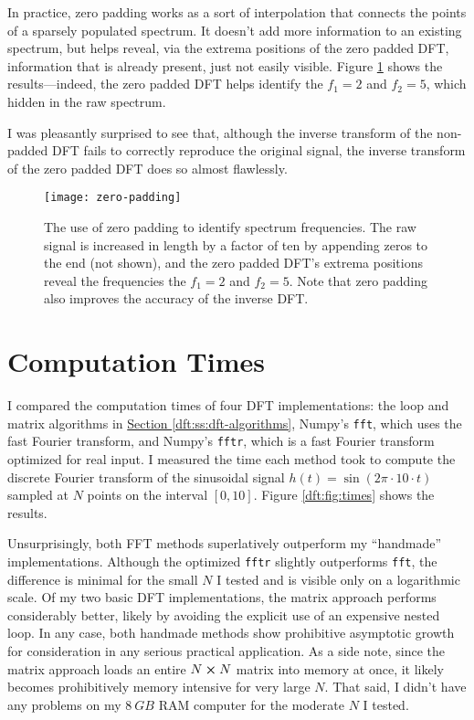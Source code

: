 \documentclass[11pt, a4paper]{article}
\begin{document}
In practice, zero padding works as a sort of interpolation that connects the points of a sparsely populated spectrum. It doesn't add more information to an existing spectrum, but helps reveal, via the extrema positions of the zero padded DFT, information that is already present, just not easily visible. Figure \ref{dft:fig:zero-padding} shows the results---indeed, the zero padded DFT helps identify the $ f_{1} = 2 $ and $ f_{2} = 5 $, which hidden in the raw spectrum.

I was pleasantly surprised to see that, although the inverse transform of the non-padded DFT fails to correctly reproduce the original signal, the inverse transform of the zero padded DFT does so almost flawlessly.  

\begin{figure}[htb!]
\centering
\texttt{[image: zero-padding]}
\vspace{-8mm}
\caption{The use of zero padding to identify spectrum frequencies. The raw signal is increased in length by a factor of ten by appending zeros to the end (not shown), and the zero padded DFT's extrema positions reveal the frequencies the $ f_{1} = 2 $ and $ f_{2} = 5 $. Note that zero padding also improves the accuracy of the inverse DFT.}
\label{dft:fig:zero-padding}
\end{figure}



\section{Computation Times} \label{dft:s:times}
I compared the computation times of four DFT implementations: the loop and matrix algorithms in  \hyperref[dft:ss:dft-algorithms]{Section \ref{dft:ss:dft-algorithms}}, Numpy's \texttt{fft}, which uses the fast Fourier transform, and Numpy's \texttt{fftr}, which is a fast Fourier transform optimized for real input. I measured the time each method took to compute the discrete Fourier transform of the sinusoidal signal $ h(t) = \sin(2\pi \cdot 10 \cdot t) $ sampled at $ N $ points on the interval $ [0, 10] $. Figure \ref{dft:fig:times} shows the results.

Unsurprisingly, both FFT methods superlatively outperform my ``handmade'' implementations. Although the optimized \texttt{fftr} slightly outperforms \texttt{fft}, the difference is minimal for the small $ N $ I tested and is visible only on a logarithmic scale. Of my two basic DFT implementations, the matrix approach performs considerably better, likely by avoiding the explicit use of an expensive nested loop. In any case, both handmade methods show prohibitive asymptotic growth for consideration in any serious practical application. As a side note, since the matrix approach loads an entire $ N \cross N $ matrix into memory at once, it likely becomes prohibitively memory intensive for very large $ N $. That said, I didn't have any problems on my  $\SI{8}{GB}$ RAM computer for the moderate $ N $ I tested.
\end{document}
